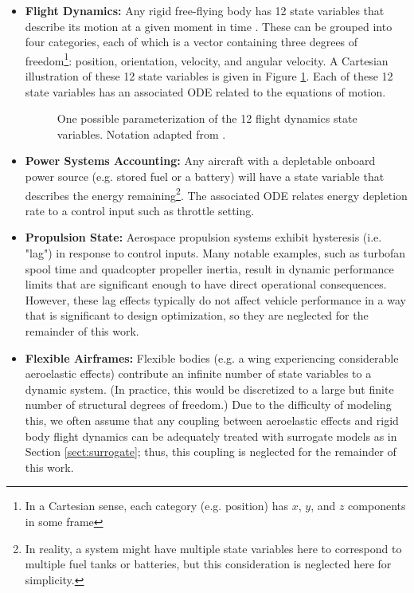 \begin{itemize}
    \item \textbf{Flight Dynamics:} Any rigid free-flying body has 12 state variables that describe its motion at a given moment in time \cite{fva}. These can be grouped into four categories, each of which is a vector containing three degrees of freedom\footnote{In a Cartesian sense, each category (e.g. position) has $x$, $y$, and $z$ components in some frame}: position, orientation, velocity, and angular velocity. A Cartesian illustration of these 12 state variables is given in Figure \ref{fig:flight-dynamics-vars}. Each of these 12 state variables has an associated ODE related to the equations of motion.
    \begin{figure}
        \centering
        
        \caption{One possible parameterization of the 12 flight dynamics state variables. Notation adapted from \cite{fva}.}
        \label{fig:flight-dynamics-vars}
    \end{figure}

    \item \textbf{Power Systems Accounting:} Any aircraft with a depletable onboard power source (e.g. stored fuel or a battery) will have a state variable that describes the energy remaining\footnote{In reality, a system might have multiple state variables here to correspond to multiple fuel tanks or batteries, but this consideration is neglected here for simplicity.}. The associated ODE relates energy depletion rate to a control input such as throttle setting.
    \item \textbf{Propulsion State:} Aerospace propulsion systems exhibit hysteresis (i.e. "lag") in response to control inputs. Many notable examples, such as turbofan spool time and quadcopter propeller inertia, result in dynamic performance limits that are significant enough to have direct operational consequences. However, these lag effects typically do not affect vehicle performance in a way that is significant to design optimization, so they are neglected for the remainder of this work. %
    \item \textbf{Flexible Airframes:} Flexible bodies (e.g. a wing experiencing considerable aeroelastic effects) contribute an infinite number of state variables to a dynamic system. (In practice, this would be discretized to a large but finite number of structural degrees of freedom.) Due to the difficulty of modeling this, we often assume that any coupling between aeroelastic effects and rigid body flight dynamics can be adequately treated with surrogate models as in Section \ref{sect:surrogate}; thus, this coupling is neglected for the remainder of this work.
\end{itemize}


